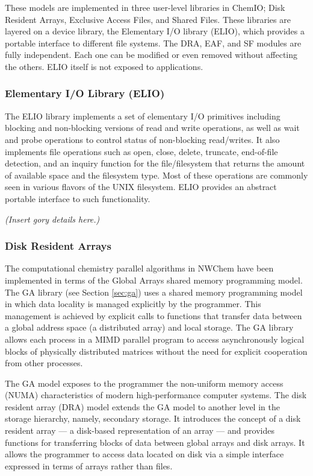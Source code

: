These models are implemented in three user-level libraries in ChemIO; Disk Resident
Arrays, Exclusive Access Files, and Shared Files.  These libraries are layered on
a device library, the Elementary I/O library (ELIO), which provides a portable
interface to different file systems.  The DRA, EAF, and SF modules are fully
independent.  Each one can be modified or even removed without affecting the others.
ELIO itself is not exposed to applications.

\subsubsection{Elementary I/O Library (ELIO)}

The ELIO library implements a set of elementary I/O primitives including blocking and
non-blocking versions of read and write operations, as well as wait and probe operations to
control status of non-blocking read/writes.  It also implements file operations such
as open, close, delete, truncate, end-of-file detection, and an inquiry function
for the file/filesystem that returns the amount of available space and the filesystem
type.  Most of these operations are commonly seen in various flavors of the UNIX
filesystem.  ELIO provides an abstract portable interface to such functionality.

{\em (Insert gory details here.)}

\subsubsection{Disk Resident Arrays}

The computational chemistry parallel algorithms in NWChem have been implemented in terms
of the Global Arrays shared memory programming model.  The GA library (see Section 
\ref{sec:ga}) uses a shared memory programming model in which data locality
is managed explicitly by the programmer.  This management is achieved by explicit
calls to functions that transfer data between a global address space (a distributed
array) and local storage.  The GA library allows each process in a MIMD parallel
program to access asynchronously logical blocks of physically distributed matrices
without the need for explicit cooperation from other processes.

The GA model exposes to the programmer the non-uniform memory access (NUMA) characteristics
of modern high-performance computer systems.  The disk resident array (DRA) model extends
the GA model to another level in the storage hierarchy, namely, secondary storage.  It 
introduces the concept of a disk resident array --- a disk-based representation of an
array --- and provides functions for transferring blocks of data between global arrays
and disk arrays.  It allows the programmer to access data located on disk via a
simple interface expressed in terms of arrays rather than files.

